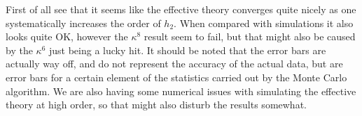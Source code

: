 \documentclass[12pt,a4paper,dvipsnames,usenames]{beamer}
\begin{document}
\begin{frame}

  {
    First of all see that it seems like the effective theory converges quite nicely as one systematically increases the order of
    $h_2$. When compared with simulations it also looks quite OK, however the $\kappa^8$ result seem to fail, but that might also be
    caused by the $\kappa^6$ just being a lucky hit. It should be noted that the error bars are actually way off, and do not
    represent the accuracy of the actual data, but are error bars for a certain element of the statistics carried out by the Monte
    Carlo algorithm. We are also having some numerical issues with simulating the effective theory at high order, so that might
    also disturb the results somewhat.
  }
\end{frame}
\end{document}
